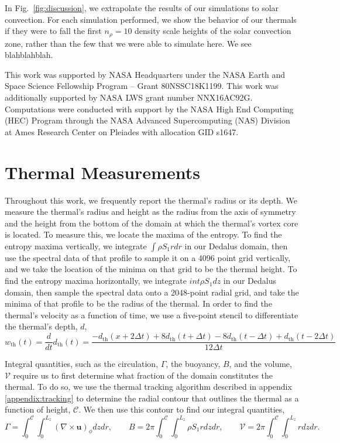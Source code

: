 \documentclass[twocolumn, amsmath, amsfonts, amssymb, trackchanges]{aastex62}
\newcommand{\grad}{\ensuremath{\nabla}}
\begin{document}
In Fig.~\ref{fig:discussion}, we extrapolate the results of our simulations to solar convection.
For each simulation performed, we show the behavior of our thermals if they were to fall the first $n_\rho = 10$ density scale heights of the solar convection zone, rather than the few that we were able to simulate here.
We see blahblahblah.


\begin{acknowledgements}
This work was supported by NASA Headquarters under the NASA Earth and Space Science Fellowship Program -- Grant 80NSSC18K1199.
This work was additionally supported by  NASA LWS grant number NNX16AC92G.  
Computations were conducted with support by the NASA High End Computing (HEC) Program through the NASA  Advanced Supercomputing (NAS) Division at Ames Research Center on Pleiades with allocation GID s1647.
\end{acknowledgements}

\appendix
\section{Thermal Measurements}
\label{appendix:measurements}
Throughout this work, we frequently report the thermal's radius or its depth.
We measure the thermal's radius and height as the radius from the axis of symmetry and the height from the bottom of the domain at which the thermal's vortex core is located.
To measure this, we locate the maxima of the entropy.
To find the entropy maxima vertically, we integrate $\int\rho S_1 r dr$ in our Dedalus domain, then use the spectral data of that profile to sample it on a 4096 point grid vertically, and we take the location of the minima on that grid to be the thermal height.
To find the entropy maxima horizontally, we integrate $int \rho S_1 dz$ in our Dedalus domain, then sample the spectral data onto a 2048-point radial grid, and take the minima of that profile to be the radius of the thermal.
In order to find the thermal's velocity as a function of time, we use a five-point stencil to differentiate the thermal's depth, $d$,
$$
w_{\text{th}}(t) = \frac{d }{dt}d_{\text{th}}(t) = \frac{-d_{\text{th}}(x + 2\Delta t) + 8d_{\text{th}}(t + \Delta t) - 8 d_{\text{th}}(t - \Delta t) + d_{\text{th}}(t - 2\Delta t)}{12\Delta t}
$$

Integral quantities, such as the circulation, $\Gamma$, the buoyancy, $B$, and the volume, $\mathcal{V}$ require us to first determine what fraction of the domain constitutes the thermal.
To do so, we use the thermal tracking algorithm described in appendix \ref{appendix:tracking} to determine the radial contour that outlines the thermal as a function of height, $\mathcal{C}$.
We then use this contour to find our integral quantities,
\begin{equation}
\Gamma = \int_0^{\mathcal{C}}\int_0^{L_z} (\grad\times\bm{u})_\phi dz dr, \qquad
B      = 2\pi \int_0^{\mathcal{C}}\int_0^{L_z} \rho S_1 r dz dr, \qquad
\mathcal{V} = 2\pi \int_0^{\mathcal{C}}\int_0^{L_z}r dz dr.
\end{equation}
\end{document}
